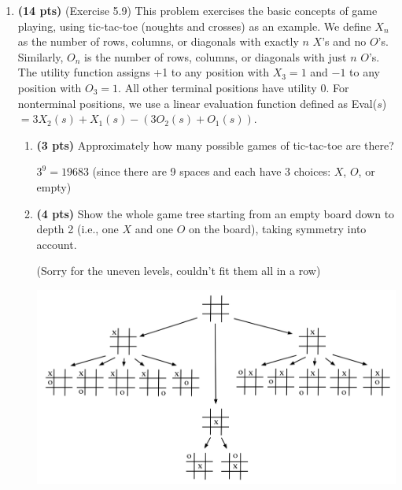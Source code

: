 \documentclass{article}
\begin{document}
\begin{enumerate}
\item \textbf{(14 pts)} (Exercise 5.9) This problem exercises the basic concepts of game playing, using tic-tac-toe (noughts and crosses) as an example. We define $X_n$ as the number of rows, columns, or diagonals with exactly $n$ $X$’s and no $O$’s. Similarly, $O_n$ is the number of rows, columns, or diagonals with just $n$ $O$’s. The utility function assigns +1 to any position with $X_3 = 1$ and $-1$ to any position with $O_3 = 1$. All other terminal positions have utility 0. For nonterminal positions, we  use a linear evaluation function defined as Eval($s$) $ = 3X_2(s) + X_1(s) - (3O_2(s) + O_1(s))$.

\begin{enumerate}[label=($\alph*$)]
    
    
    \item \textbf{(3 pts)} Approximately how many possible games of tic-tac-toe are there?

    \color{blue}
        $3^9 = 19683$ (since there are 9 spaces and each have 3 choices: $X$, $O$, or empty)
    \color{black}



    \item \textbf{(4 pts)} Show the whole game tree starting from an empty board down to depth 2 (i.e., one $X$ and one $O$ on the board), taking symmetry into account.

    \color{blue}
        (Sorry for the uneven levels, couldn't fit them all in a row)
    \color{black}

    \includegraphics[scale=0.5]{472-PS4-Q2-B.png}


\end{enumerate}
\end{enumerate}
\end{document}
